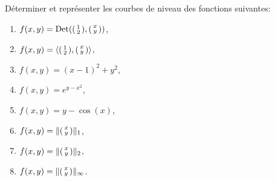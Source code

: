 \documentclass{tp_um}
\begin{document}
\newpage

\exo{} Déterminer et représenter les courbes de niveau des fonctions suivantes: \\
\begin{multicols}{3}
\begin{enumerate}
	\item	$f(x,y) = \operatorname{Det}(\begin{psmallmatrix}
			1\\2
		\end{psmallmatrix}, \begin{psmallmatrix}
			x \\ y
	\end{psmallmatrix}) $, 
	\item $f(x,y) = \left\langle \begin{psmallmatrix}
			1\\2
		\end{psmallmatrix}, \begin{psmallmatrix}
			x \\ y
	\end{psmallmatrix}\right\rangle$, 
	\item $f(x,y) = (x-1)^2+y^2$, 
	\item $f(x,y) = e^{y-x^2}$, 
	\item $f(x,y) = y - \cos(x)$,
    \item $f(x,y) = \lVert\begin{psmallmatrix}
			x \\ y
	\end{psmallmatrix}\rVert_1$, 
    \item $f(x,y) = \lVert\begin{psmallmatrix}
			x \\ y
	\end{psmallmatrix}\rVert_2$, 
    \item $f(x,y) = \lVert\begin{psmallmatrix}
			x \\ y
	\end{psmallmatrix}\rVert_\infty$. 
\end{enumerate}
\end{multicols}
\end{document}
